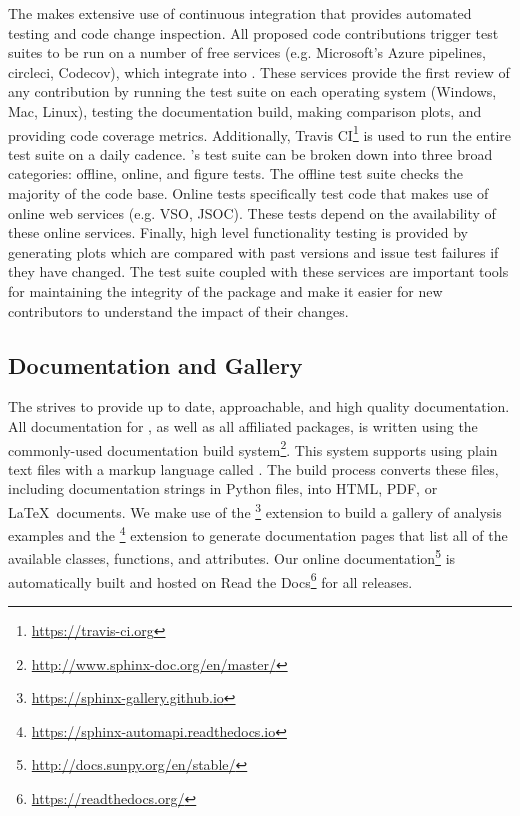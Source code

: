 The \sunpyproj makes extensive use of continuous integration that provides automated testing and code change inspection.
All proposed code contributions trigger test suites to be run on a number of free services (e.g.
Microsoft's Azure pipelines, circleci, Codecov), which integrate into \github.
These services provide the first review of any contribution by running the test suite on each operating system (Windows, Mac, Linux), testing the documentation build, making comparison plots, and providing code coverage metrics.
Additionally, Travis CI\footnote{\url{https://travis-ci.org}} is used to run the entire test suite on a daily cadence.
\sunpypkg's test suite can be broken down into three broad categories: offline, online, and figure tests.
The offline test suite checks the majority of the code base.
Online tests specifically test code that makes use of online web services (e.g. VSO, JSOC).
These tests depend on the availability of these online services.
Finally, high level functionality testing is provided by generating plots which are compared with past versions and issue test failures if they have changed.
The \sunpypkg test suite coupled with these services are important tools for maintaining the integrity of the package and make it easier for new contributors to understand the impact of their changes.

\subsection{Documentation and Gallery}
\label{sec:docs}

The \sunpyproj strives to provide up to date, approachable, and high quality documentation.
All documentation for \sunpypkg, as well as all affiliated packages, is written using the commonly-used  documentation build system\footnote{\url{http://www.sphinx-doc.org/en/master/}}.
This system supports using plain text files with a markup language called .
The build process converts these files, including documentation strings in Python files, into HTML, PDF, or \LaTeX\ documents.
We make use of the \footnote{\url{https://sphinx-gallery.github.io}} extension to build a gallery of analysis examples and the \footnote{\url{https://sphinx-automapi.readthedocs.io}} extension to generate documentation pages that list all of the available classes, functions, and attributes.
Our online documentation\footnote{\url{http://docs.sunpy.org/en/stable/}} is automatically built and hosted on Read the Docs\footnote{\url{https://readthedocs.org/}} for all releases.
